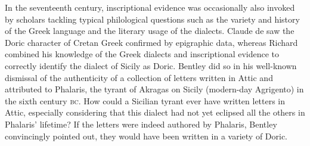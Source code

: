 In the seventeenth century, inscriptional evidence was occasionally also invoked by scholars tackling typical philological questions such as the variety and history of the Greek language and the literary usage of the dialects. Claude de \citet[430]{Saumaise1643a} saw the Doric character of Cretan Greek confirmed by epigraphic data, whereas Richard \citet[311]{Bentley1699} combined his knowledge of the Greek dialects and inscriptional evidence to correctly identify the dialect of Sicily as Doric. Bentley did so in his well-known dismissal of the authenticity of a collection of letters written in Attic and attributed to Phalaris, the tyrant of Akragas on Sicily (modern-day Agrigento) in the sixth century \textsc{bc}. How could a Sicilian tyrant ever have written letters in Attic, especially considering that this dialect had not yet eclipsed all the others in Phalaris’ lifetime? If the letters were indeed authored by Phalaris, Bentley convincingly pointed out, they would have been written in a variety of Doric.

